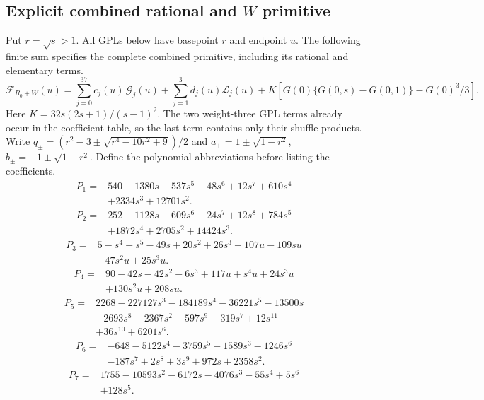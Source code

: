 \subsection{Explicit combined rational and \texorpdfstring{$W$}{W} primitive}
Put $r=\sqrt{s}>1$. All GPLs below have basepoint $r$ and endpoint $u$. The following finite sum specifies the complete combined primitive, including its rational and elementary terms.
\begin{equation}
 \mathcal F_{R_0+W}(u)=\sum_{j=0}^{37}c_j(u)\,\mathcal G_j(u)+\sum_{j=1}^3 d_j(u)\mathcal L_j(u)
 +K\left[G(0)\{G(0,s)-G(0,1)\}-G(0)^3/3\right].
\end{equation}
Here $K=32s(2s+1)/(s-1)^2$. The two weight-three GPL terms already occur in the coefficient table, so the last term contains only their shuffle products. Write $q_\pm=(r^2-3\pm\sqrt{r^4-10r^2+9})/2$ and $a_\pm=1\pm\sqrt{1-r^2}$, $b_\pm=-1\pm\sqrt{1-r^2}$.
Define the polynomial abbreviations before listing the coefficients.
\begin{align}
P_{1}={}&540- 1380 s- 537 s^{5}- 48 s^{6}+12 s^{7}+610 s^{4}\\
&+2334 s^{3}+12701 s^{2}.
\end{align}
\begin{align}
P_{2}={}&252- 1128 s- 609 s^{6}- 24 s^{7}+12 s^{8}+784 s^{5}\\
&+1872 s^{4}+2705 s^{2}+14424 s^{3}.
\end{align}
\begin{align}
P_{3}={}&5- s^{4}- s^{5}- 49 s+20 s^{2}+26 s^{3}+107 u- 109 s u\\
&- 47 s^{2} u+25 s^{3} u.
\end{align}
\begin{align}
P_{4}={}&90- 42 s- 42 s^{2}- 6 s^{3}+117 u+s^{4} u+24 s^{3} u\\
&+130 s^{2} u+208 s u.
\end{align}
\begin{align}
P_{5}={}&2268- 227127 s^{3}- 184189 s^{4}- 36221 s^{5}- 13500 s\\
&- 2693 s^{8}- 2367 s^{2}- 597 s^{9}- 319 s^{7}+12 s^{11}\\
&+36 s^{10}+6201 s^{6}.
\end{align}
\begin{align}
P_{6}={}&-648- 5122 s^{4}- 3759 s^{5}- 1589 s^{3}- 1246 s^{6}\\
&- 187 s^{7}+2 s^{8}+3 s^{9}+972 s+2358 s^{2}.
\end{align}
\begin{align}
P_{7}={}&1755- 10593 s^{2}- 6172 s- 4076 s^{3}- 55 s^{4}+5 s^{6}\\
&+128 s^{5}.
\end{align}
